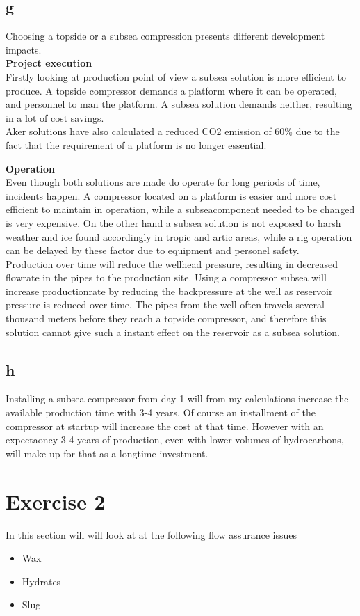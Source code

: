 \documentclass[a4paper,norsk]{article}
\begin{document}
\subsection*{g}
Choosing a topside or a subsea compression presents different development impacts. \\
\textbf{Project execution} \\
Firstly looking at production point of view a subsea solution is more efficient to produce. A topside compressor demands a platform where it can be operated, and personnel to man the platform. A subsea solution demands neither, resulting in a lot of cost savings. \\
Aker solutions have also calculated a reduced CO2 emission of 60\% due to the fact that the requirement of a platform is no longer essential. 

\textbf{Operation} \\
Even though both solutions are made do operate for long periods of time, incidents happen. A compressor located on a platform is easier and more cost efficient to maintain in operation, while a subseacomponent needed to be changed is very expensive. On the other hand a subsea solution is not exposed to harsh weather and ice found accordingly in tropic and artic areas, while a rig operation can be delayed by these factor due to equipment and personel safety. \\
Production over time will reduce the wellhead pressure, resulting in decreased flowrate in the pipes to the production site. Using a compressor subsea will increase productionrate by reducing the backpressure at the well as reservoir pressure is reduced over time. The pipes from the well often travels several thousand meters before they reach a topside compressor, and therefore this solution cannot give such a instant effect on the reservoir as a subsea solution.

\subsection*{h}
Installing a subsea compressor from day 1 will from my calculations increase the available production time with 3-4 years. Of course an installment of the compressor at startup will increase the cost at that time. However with an expectaoncy 3-4 years of production, even with lower volumes of hydrocarbons, will make up for that as a longtime investment.



\section*{Exercise 2}
In this section will will look at at the following flow assurance issues
\begin{itemize}
\item Wax
\item Hydrates
\item Slug
\end{itemize}
\end{document}

